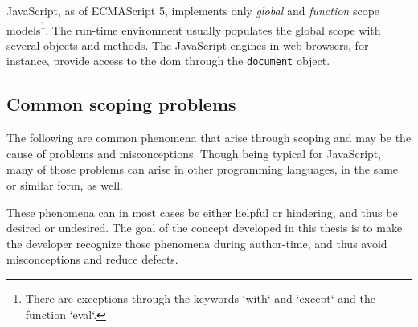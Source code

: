 JavaScript, as of ECMAScript 5, implements only \emph{global} and
\emph{function} scope
models\footnote{There are exceptions through the keywords `with` and `except` and the function `eval`.}.
The run-time environment usually populates the global scope with several
objects and methods. The JavaScript engines in web browsers, for
instance, provide access to the \ac{dom} through the \texttt{document}
object.

\subsection{Common scoping problems}\label{common-scoping-problems}

The following are common phenomena that arise through scoping and may be
the cause of problems and misconceptions. Though being typical for
JavaScript, many of those problems can arise in other programming
languages, in the same or similar form, as well.

These phenomena can in most cases be either helpful or hindering, and
thus be desired or undesired. The goal of the concept developed in this
thesis is to make the developer recognize those phenomena during
author-time, and thus avoid misconceptions and reduce defects.

